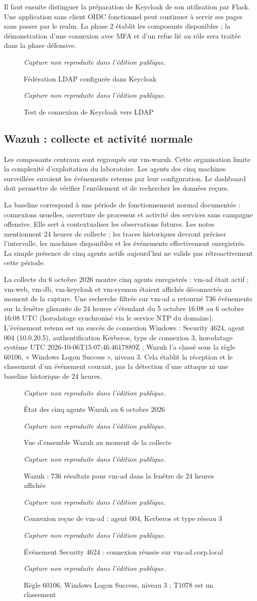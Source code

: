 \documentclass[a4paper,12pt]{report}
\newcommand{\publiccapture}[1]{%
  \begin{figure}[H]\centering
  {\footnotesize\itshape Capture non reproduite dans l'édition publique.}
  \caption{#1}\end{figure}}
\begin{document}
Il faut ensuite distinguer la préparation de Keycloak de son utilisation par Flask. Une application sans client OIDC fonctionnel peut continuer à servir ses pages sans passer par le realm. La phase 2 établit les composants disponibles ; la démonstration d'une connexion avec MFA et d'un refus lié au rôle sera traitée dans la phase défensive.
\publiccapture{Fédération LDAP configurée dans Keycloak}
\publiccapture{Test de connexion de Keycloak vers LDAP}

\subsection{Wazuh : collecte et activité normale}
Les composants centraux sont regroupés sur vm-wazuh. Cette organisation limite la complexité d'exploitation du laboratoire. Les agents des cinq machines surveillées envoient les événements retenus par leur configuration. Le dashboard doit permettre de vérifier l'enrôlement et de rechercher les données reçues.

La baseline correspond à une période de fonctionnement normal documentée : connexions usuelles, ouverture de processus et activité des services sans campagne offensive. Elle sert à contextualiser les observations futures. Les notes mentionnent 24 heures de collecte ; les traces historiques devront préciser l'intervalle, les machines disponibles et les événements effectivement enregistrés. La simple présence de cinq agents actifs aujourd'hui ne valide pas rétroactivement cette période.

La collecte du 6 octobre 2026 montre cinq agents enregistrés : vm-ad était actif ; vm-web, vm-db, vm-keycloak et vm-sysmon étaient affichés déconnectés au moment de la capture. Une recherche filtrée sur vm-ad a retourné 736 événements sur la fenêtre glissante de 24 heures s'étendant du 5 octobre 16:08 au 6 octobre 16:08 UTC (horodatage synchronisé via le service NTP du domaine). L'événement retenu est un succès de connexion Windows : Security 4624, agent 004 (10.0.20.5), authentification Kerberos, type de connexion 3, horodatage système UTC 2026-10-06T15:07:46.4617889Z ; Wazuh l'a classé sous la règle 60106, « Windows Logon Success », niveau 3. Cela établit la réception et le classement d'un événement courant, pas la détection d'une attaque ni une baseline historique de 24 heures.
\publiccapture{État des cinq agents Wazuh au 6 octobre 2026}
\publiccapture{Vue d'ensemble Wazuh au moment de la collecte}
\publiccapture{Wazuh : 736 résultats pour vm-ad dans la fenêtre de 24 heures affichée}
\publiccapture{Connexion reçue de vm-ad : agent 004, Kerberos et type réseau 3}
\publiccapture{Événement Security 4624 : connexion réussie sur vm-ad.corp.local}
\publiccapture{Règle 60106, Windows Logon Success, niveau 3 ; T1078 est un classement}
\end{document}
